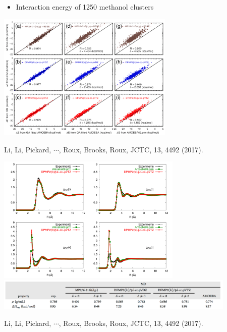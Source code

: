 \documentclass[handout]{beamer} %
\begin{document}
\begin{frame}
\begin{itemize}
\item \scriptsize{Interaction energy of 1250 methanol clusters} 
\end{itemize}
\begin{center}
\includegraphics[height=2.4in]{figures_ml/Roux_scatter.png}
\end{center}
\begin{center}
\scriptsize{Li, Li, Pickard, $\cdots$, Roux, Brooks, Roux, JCTC, 13, 4492 (2017).}
\end{center} 
\end{frame}


\begin{frame}
\begin{center}
\includegraphics[height=2.4in]{figures_ml/Roux_radial.png} \\
\includegraphics[height=0.6in]{figures_ml/Roux_density.png} 
\end{center}
\begin{center}
\scriptsize{Li, Li, Pickard, $\cdots$, Roux, Brooks, Roux, JCTC, 13, 4492 (2017).}
\end{center} 
\end{frame}
\end{document}
